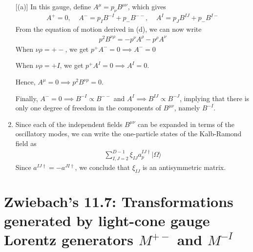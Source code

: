\documentclass[11pt]{article}
\begin{document}
\begin{enumerate} [(a)]
    In this gauge, define $A^\mu = p_\nu B^{\mu\nu}$, which gives 
    \begin{align*}
        A^+ = 0, ~~~~~ A^- = p_I B^{-I} + p_- B^{--}, ~~~~~ A^I = p_J B^{IJ} + p_- B^{I-} 
    \end{align*}
    From the equation of motion derived in (d), we can now write
    \begin{align*}
        p^2 B^{\nu \rho } = -p^\nu A^\rho - p^\rho A^\nu 
    \end{align*}
    When $\nu \rho = +-$, we get $p^+ A^- = 0 \implies A^- = 0$

    When $ \nu \rho = +I$, we get $p^+ A^I = 0 \implies A^I = 0$. 

    Hence, $A^\mu = 0 \implies p^2 B^{\nu \rho} = 0$. 

    Finally, $A^- = 0 \implies B^{-I} \propto B^{--}$ and $A^I \implies B^{IJ} \propto B^{-J}$, implying that there is only one degree of freedom in the components of $B^{\mu\nu}$, namely $B^{-I}$. 

    \item Since each of the independent fields $B^{\mu\nu}$ can be expanded in terms of the oscillatory modes, we can write the one-particle states of the Kalb-Ramond field as 
    \begin{align*}
        \sum_{I,J=2}^{D-1} \xi_{IJ} a^{IJ \dagger}_p |\Omega \rangle 
    \end{align*}
    Since $a^{IJ\dagger} = - a^{JI\dagger}$, we conclude that $\xi_{IJ}$ is an antisymmetric matrix. 

\end{enumerate}

\newpage
\section{Zwiebach's 11.7: Transformations generated by light-cone gauge Lorentz generators $M^{+-}$ and $M^{-I}$}
\end{document}
